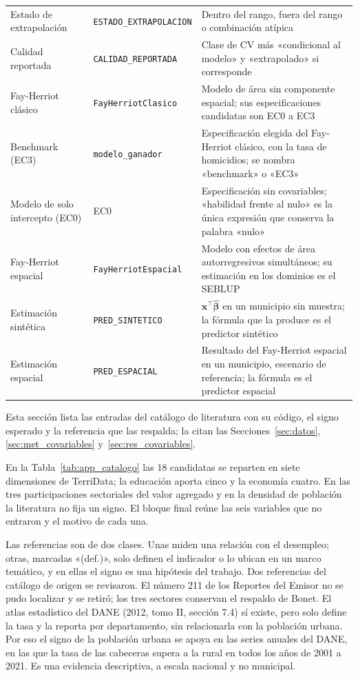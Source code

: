 {\begin{longtable}{p{3.5cm} p{3.5cm} p{5.7cm}}
Estado de extrapolación & \texttt{ESTADO\_EXTRAPOLACION} & Dentro del rango, fuera del rango o combinación atípica \\
Calidad reportada & \texttt{CALIDAD\_REPORTADA} & Clase de CV más «condicional al modelo» y «extrapolado» si corresponde \\
\midrule
Fay-Herriot clásico & \texttt{FayHerriotClasico} & Modelo de área sin componente espacial; sus especificaciones candidatas son EC0 a EC3 \\
Benchmark (EC3) & \texttt{modelo\_ganador} & Especificación elegida del Fay-Herriot clásico, con la tasa de homicidios; se nombra «benchmark» o «EC3» \\
Modelo de solo intercepto (EC0) & EC0 & Especificación sin covariables; «habilidad frente al nulo» es la única expresión que conserva la palabra «nulo» \\
Fay-Herriot espacial & \texttt{FayHerriotEspacial} & Modelo con efectos de área autorregresivos simultáneos; su estimación en los dominios es el SEBLUP \\
Estimación sintética & \texttt{PRED\_SINTETICO} & $\mathbf{x}^\top\hat{\boldsymbol{\beta}}$ en un municipio sin muestra; la fórmula que la produce es el predictor sintético \\
Estimación espacial & \texttt{PRED\_ESPACIAL} & Resultado del Fay-Herriot espacial en un municipio, escenario de referencia; la fórmula es el predictor espacial \\
\end{longtable}
}
\label{app:catalogo}

Esta sección lista las entradas del catálogo de literatura con su código, el signo esperado y la referencia que las respalda; la citan las Secciones~\ref{sec:datos}, \ref{sec:met_covariables} y~\ref{sec:res_covariables}.

En la Tabla~\ref{tab:app_catalogo} las 18 candidatas se reparten en siete dimensiones de TerriData; la educación aporta cinco y la economía cuatro. En las tres participaciones sectoriales del valor agregado y en la densidad de población la literatura no fija un signo. El bloque final reúne las seis variables que no entraron y el motivo de cada una.

Las referencias son de dos clases. Unas miden una relación con el desempleo; otras, marcadas «(def.)», solo definen el indicador o lo ubican en un marco temático, y en ellas el signo es una hipótesis del trabajo. Dos referencias del catálogo de origen se revisaron. El número 211 de los Reportes del Emisor no se pudo localizar y se retiró; los tres sectores conservan el respaldo de Bonet. El atlas estadístico del DANE (2012, tomo II, sección 7.4) sí existe, pero solo define la tasa y la reporta por departamento, sin relacionarla con la población urbana. Por eso el signo de la población urbana se apoya en las series anuales del DANE, en las que la tasa de las cabeceras supera a la rural en todos los años de 2001 a 2021. Es una evidencia descriptiva, a escala nacional y no municipal.

